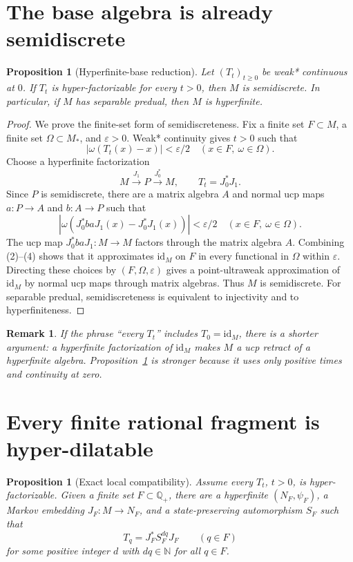 \documentclass[11pt]{article}
\newtheorem{proposition}[theorem]{Proposition}
\newtheorem{remark}[theorem]{Remark}
\newcommand{\N}{\mathbb N}
\newcommand{\Q}{\mathbb Q}
\newcommand{\id}{\mathrm{id}}
\begin{document}
\section{The base algebra is already semidiscrete}

\begin{proposition}[Hyperfinite-base reduction]\label{prop:base}
Let $(T_t)_{t\geq0}$ be weak* continuous at $0$.  If $T_t$ is
hyper-factorizable for every $t>0$, then $M$ is semidiscrete.  In particular,
if $M$ has separable predual, then $M$ is hyperfinite.
\end{proposition}

\begin{proof}
We prove the finite-set form of semidiscreteness.  Fix a finite set
$F\subset M$, a finite set $\Omega\subset M_*$, and $\varepsilon>0$.
Weak* continuity gives $t>0$ such that
\[
 |\omega(T_t(x)-x)|<\varepsilon/2
 \quad(x\in F,\ \omega\in\Omega).                 \tag{2}
\]
Choose a hyperfinite factorization
\[
 M\xrightarrow{J_1}P\xrightarrow{J_0^*}M,
 \qquad T_t=J_0^*J_1.                              \tag{3}
\]
Since $P$ is semidiscrete, there are a matrix algebra $A$ and normal ucp
maps $a:P\to A$ and $b:A\to P$ such that
\[
 |\omega(J_0^*baJ_1(x)-J_0^*J_1(x))|<\varepsilon/2
 \quad(x\in F,\ \omega\in\Omega).                \tag{4}
\]
The ucp map $J_0^*baJ_1:M\to M$ factors through the matrix algebra $A$.
Combining (2)--(4) shows that it approximates $\id_M$ on $F$ in every
functional in $\Omega$ within $\varepsilon$.  Directing these choices by
$(F,\Omega,\varepsilon)$ gives a point-ultraweak approximation of $\id_M$
by normal ucp maps through matrix algebras.  Thus $M$ is semidiscrete.
For separable predual, semidiscreteness is equivalent to injectivity and to
hyperfiniteness.
\end{proof}

\begin{remark}
If the phrase ``every $T_t$'' includes $T_0=\id_M$, there is a shorter
argument: a hyperfinite factorization of $\id_M$ makes $M$ a ucp retract of a
hyperfinite algebra.  Proposition~\ref{prop:base} is stronger because it uses
only positive times and continuity at zero.
\end{remark}

\section{Every finite rational fragment is hyper-dilatable}

\begin{proposition}[Exact local compatibility]\label{prop:finite}
Assume every $T_t$, $t>0$, is hyper-factorizable.  Given a finite set
$F\subset\Q_+$, there are a hyperfinite $(N_F,\psi_F)$, a Markov embedding
$J_F:M\to N_F$, and a state-preserving automorphism $S_F$ such that
\[
 T_q=J_F^*S_F^{dq}J_F\qquad(q\in F)                \tag{5}
\]
for some positive integer $d$ with $dq\in\N$ for all $q\in F$.
\end{proposition}
\end{document}
